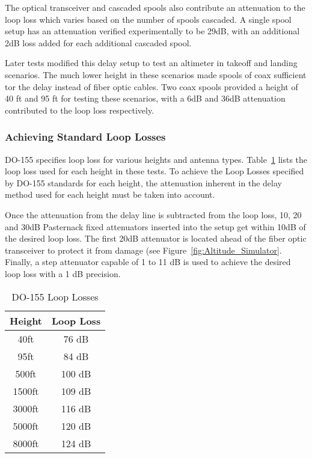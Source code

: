  The optical transceiver and cascaded spools also contribute an attenuation to the loop loss which varies based on the number of spools cascaded. A single spool setup has an attenuation verified experimentally to be 29dB, with an additional 2dB loss added for each additional cascaded spool.

Later tests modified this delay setup to test an altimeter in takeoff and landing scenarios. The much lower height in these scenarios made spools of coax sufficient tor the delay instead of fiber optic cables. Two coax spools provided a height of 40 ft and 95 ft for testing these scenarios, with a 6dB and 36dB attenuation contributed to the loop loss respectively.  

\subsubsection{Achieving Standard Loop Losses}\label{subsub:loss}
DO-155 specifies loop loss for various heights and antenna types. Table~\ref{tab:loop loss} lists the loop loss used for each height in these tests. To achieve the Loop Losses specified by DO-155 standards for each height, the attenuation inherent in the delay method used for each height must be taken into account. 

Once the attenuation from the delay line is subtracted from the loop loss, 10, 20 and 30dB Pasternack fixed attenuators inserted into the setup get within 10dB of the desired loop loss. The first 20dB attenuator is located ahead of the fiber optic transceiver to protect it from damage (see Figure~\ref{fig:Altitude_Simulator}.  Finally, a step attenuator capable of 1 to 11 dB is used to achieve the desired loop loss with a 1 dB precision. 

\begin{table}[]
\centering
\begin{tabular}{|c|c|}
\hline
\textbf{Height} & \textbf{Loop Loss} \\ \hline
40ft            & 76 dB              \\ \hline
95ft            & 84 dB              \\ \hline
500ft           & 100 dB             \\ \hline
1500ft          & 109 dB             \\ \hline
3000ft          & 116 dB             \\ \hline
5000ft          & 120 dB             \\ \hline
8000ft          & 124 dB             \\ \hline
\end{tabular}
\caption{DO-155 Loop Losses}
\label{tab:loop loss}
\end{table}

